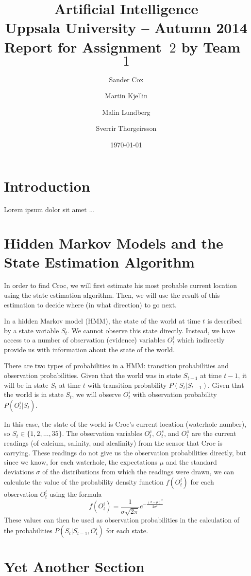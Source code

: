 \documentclass[a4paper]{article}
\title{\textbf{Artificial Intelligence \\
    Uppsala University -- Autumn 2014 \\
    Report for Assignment~$2$
    by Team~$1$
  }
}
\author{Sander Cox \and Martin Kjellin \and Malin Lundberg \and Sverrir
  Thorgeirsson}
\date{\today}
\begin{document}
\maketitle

\section{Introduction}

Lorem ipsum dolor sit amet ...

\section{Hidden Markov Models and the State Estimation Algorithm}

In order to find Croc, we will first estimate his most probable current
location using the state estimation algorithm. Then, we will use the result of
this estimation to decide where (in what direction) to go next.

In a hidden Markov model (HMM), the state of the world at time $t$ is described by a
state variable $S_t$. We cannot observe this state directly. Instead, we have
access to a number of observation (evidence) variables $O^i_t$ which
indirectly provide us with information about the state of the world.

There are two types of probabilities in a HMM: transition probabilities and
observation probabilities. %
Given that the world was in state $S_{t-1}$ at time $t-1$, it
will be in state $S_t$ at time $t$ with transition probability
$P(S_t|S_{t-1})$. Given that the world is in state $S_t$, we will observe
$O^i_t$ with observation probability $P(O^i_t|S_t)$. %

In this case, the state of the world is Croc's current location (waterhole number), so $S_t \in
\{1, 2, \dots, 35\}$. %
The observation variables $O^c_t$, $O^s_t$, and $O^a_t$ are the current
readings (of calcium, salinity, and alcalinity) %
from the sensor that Croc is
carrying. These readings do not give us the observation probabilities
directly, but since we know, for each waterhole, the expectations $\mu$ and the
standard deviations $\sigma$ of the distributions from which the readings were
drawn, we can calculate the value of the probability density function
$f(O^i_t)$ for each observation $O^i_t$ using the formula
\begin{equation*}
  f(O^i_t) = \frac{1}{\sigma \sqrt{2 \pi}}e^{-\frac{(x-\mu)^2}{2\sigma ^2}}
\end{equation*}
These values can then be used as observation probabilities in the calculation
of the probabilities $P(S_t|S_{t-1}, O^i_t)$ for each state. %

\section{Yet Another Section}
\end{document}
